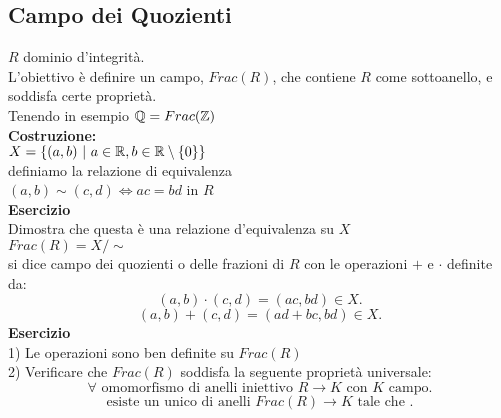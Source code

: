 \documentclass[12px]{article}
\begin{document}
	 \subsection{Campo dei Quozienti}
	  $R$ dominio d'integrità.\\
	  L'obiettivo è definire un campo, $Frac(R)$, che contiene  $R$ come sottoanello, e soddisfa certe proprietà.\\
	  Tenendo in esempio $\mathbb{Q} = Frac(\mathbb{Z})$ \\
	  \textbf{Costruzione:}\\
	  $X = \{(a,b)\ |\ a\in\mathbb{R}, b\in\mathbb{R}\setminus\{0\}\}$ \\
	  definiamo la relazione di equivalenza\\
	  $(a,b)\sim (c,d) \Leftrightarrow ac = bd$ in $R$\\
	   \textbf{Esercizio}\\
	   Dimostra che questa è una relazione d'equivalenza su $X$\\
	   $Frac(R) = X/\sim$\\
	   si dice campo dei quozienti o delle frazioni di $R$ con le operazioni  $+$ e $\cdot$ definite da:\\
	    \[
		    (a,b)\cdot(c,d) = (ac,bd)\in X
	   .\] 
	   \[
		   (a,b) + (c,d) = (ad + bc,bd)\in X
	   .\] 
	   \textbf{Esercizio}\\
	   1) Le operazioni sono ben definite su $Frac(R)$\\
	   2) Verificare che  $Frac(R)$ soddisfa la seguente proprietà universale:
	    \[
		    \forall \text{ omomorfismo di anelli iniettivo } R \rightarrow K \text{ con } K \text{ campo} 
	   .\] 
	   \[
		   \text{esiste un unico di anelli } Frac(R) \rightarrow K \text{ tale che }
	   .\] 


 
 
\end{document}
